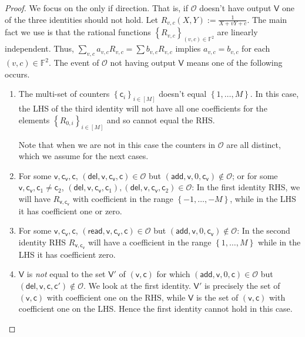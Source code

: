 \documentclass[11pt]{article} %
\newcommand{\F}{\ensuremath{\mathbb F}\xspace}
\newcommand{\defeq}{:=}
\newcommand{\sett}[2]{\ensuremath{\set{#1}_{#2}}\xspace}
\newcommand{\rel}{\ensuremath{\mathcal{R}}\xspace}
\newcommand{\set}[1]{\ensuremath{\left\{#1\right\}}\xspace}
\renewcommand{\c}{\ensuremath{\mathsf{c}}\xspace}
\newcommand{\vc}{\ensuremath{\mathsf{c_v}}\xspace}
\renewcommand{\v}{\ensuremath{\mathsf{v}}\xspace}
\newcommand{\add}{\ensuremath{\mathsf{add}}\xspace}
\newcommand{\del}{\ensuremath{\mathsf{del}}\xspace}
\renewcommand{\read}{\ensuremath{\mathsf{read}}\xspace}
\newcommand{\countrange}{\ensuremath{[M]}\xspace}
\newcommand{\ops}{\ensuremath{\mathcal{O}}\xspace}
\newcommand{\recset}{\ensuremath{\mathsf{V}}\xspace}
\newcommand{\shlomomath}[1]{\ensuremath{\text{\usefont{U}{BOONDOX-cal}{m}{n}#1}}\xspace}
\newcommand{\finpred}{\shlomomath{f}}
\newcommand{\relrcg}{\ensuremath{\rel_{F,\finpred}}\xspace}
\newcommand{\relrcgstar}{\ensuremath{\rel_{F^*,\finpred^*}}\xspace}
\begin{document}
\begin{proof}

We focus on the only if direction. That is, if \ops doesn't have output \recset one of the three identities should not hold.
 Let $R_{v,c}(X,Y)\defeq \frac{1}{X+vY+c}$. The main fact we use is that the rational functions $\sett{R_{v,c}}{(v,c)\in \F^2}$ are linearly independent.
 Thus, $\sum_{v,c} a_{v,c} R_{v,c} = \sum b_{v,c} R_{v,c}$ implies $a_{v,c}=b_{v,c}$ for each $(v,c)\in \F^2$.
 The event of \ops not having output \recset means one of the following occurs.
 \begin{enumerate}
  \item The multi-set of counters $\sett{\c_i}{i\in \countrange}$ doesn't equal \set{1,\ldots,M}. In this case, the LHS of the third identity will not have all one coefficients for the elements \sett{R_{0,i}}{i\in \countrange} and so cannot equal the RHS.

  Note that when we are not in this case the counters in \ops are all distinct, which we assume for the next cases.
 \item For some $\v,\vc,\c$, $(\del,\v,\vc,\c)\in \ops$ but $(\add,\v,0,\vc)\notin \ops$; or for some $\v,\vc,\c_1\neq \c_2$, $(\del,\v,\vc,\c_1),(\del,\v,\vc,\c_2)\in \ops$: In the first identity RHS, we will have $R_{\v,\vc}$ with coefficient in the range $\set{-1,\ldots,-M}$, while in the LHS it has coefficient one or zero.
 \item For some $\v,\vc,\c$, $(\read,\v,\vc,\c)\in \ops$ but $(\add,\v,0,\vc)\notin \ops$: In the second identity RHS $R_{\v,\vc}$ will have a coefficient in the range $\set{1,\ldots,M}$ while in the LHS it has coefficient zero.
 \item \recset is \emph{not} equal to the set $\recset'$ of $(\v,\c)$ for which $(\add,\v,0,\c)\in \ops$ but $(\del,\v,\c,\c')\notin \ops$. We look at the first identity. $\recset'$ is precisely the set of $(\v,\c)$ with coefficient one on the RHS, while \recset is the set of $(\v,\c)$ with coefficient one on the LHS. Hence the first identity cannot hold in this case.
 \end{enumerate}
\end{proof}








\end{document}
